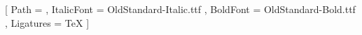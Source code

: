 \setmainfont{OldStandard-Regular.ttf}[
  Path = \fontdir , ItalicFont = OldStandard-Italic.ttf ,
  BoldFont = OldStandard-Bold.ttf , Ligatures = TeX ]
